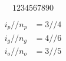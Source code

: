 \documentclass[preview]{standalone}
\newcommand{\dslash}{/\!\!/}
\begin{document}
\begin{equation*}
  1 2 3 4 5 6 7 8 9 0  
\end{equation*}

\begin{equation*}
  \begin{aligned}
    i_p \dslash n_p &= 3 \dslash 4 \\
    i_g \dslash n_g &= 4 \dslash 6 \\
    i_o \dslash n_o &= 3 \dslash 5
  \end{aligned}
\end{equation*}
\end{document}
